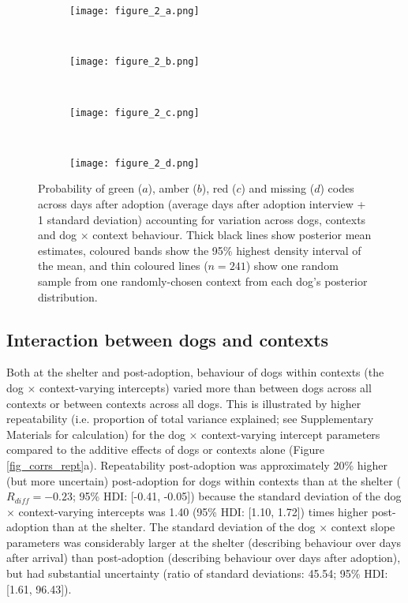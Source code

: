 \documentclass[12pt]{article}
\begin{document}
\begin{figure}
  \hspace{-2cm}%
  \begin{subfigure}{0.4\textwidth}
    \centering
    \texttt{[image: figure\_2\_a.png]}
  \end{subfigure}%
  ~%
  \hspace{-2cm}
  \begin{subfigure}{0.4\textwidth}
    \centering
    \texttt{[image: figure\_2\_b.png]}
  \end{subfigure}%
  ~%
  \hspace{-2cm}
  \begin{subfigure}{0.4\textwidth}
    \centering
    \texttt{[image: figure\_2\_c.png]}
  \end{subfigure}%
  ~%
  \hspace{-2cm}
  \begin{subfigure}{0.4\textwidth}
    \centering
    \texttt{[image: figure\_2\_d.png]}
  \end{subfigure}%

  \caption{Probability of green ($a$), amber ($b$), red ($c$) and missing ($d$) codes across days after adoption (average days after adoption interview + 1 standard deviation)  accounting for variation across dogs, contexts and dog $\times$ context behaviour. Thick black lines show posterior mean estimates, coloured bands show the 95\% highest density interval of the mean, and thin coloured lines ($n = 241$) show one random sample from one randomly-chosen context from each dog's posterior distribution.}
  \label{fig_adoption_behaviour}
\end{figure}

\subsection{Interaction between dogs and contexts}
Both at the shelter and post-adoption, behaviour of dogs within contexts (the dog $\times$ context-varying intercepts) varied more than between dogs across all contexts or between contexts across all dogs. This is illustrated by higher repeatability (i.e. proportion of total variance explained; see Supplementary Materials for calculation) for the dog $\times$ context-varying intercept parameters compared to the additive effects of dogs or contexts alone (Figure \ref{fig_corrs_rept}a). Repeatability post-adoption was approximately 20\% higher (but more uncertain) post-adoption for dogs within contexts than at the shelter ($R_{diff} = -0.23$; 95\% HDI: [-0.41, -0.05]) because the standard deviation of the dog $\times$ context-varying intercepts was 1.40 (95\% HDI: [1.10, 1.72]) times higher post-adoption than at the shelter. The standard deviation of the dog $\times$ context slope parameters was considerably larger at the shelter (describing behaviour over days after arrival) than post-adoption (describing behaviour over days after adoption), but had substantial uncertainty (ratio of standard deviations: 45.54; 95\% HDI: [1.61, 96.43]).
\end{document}
